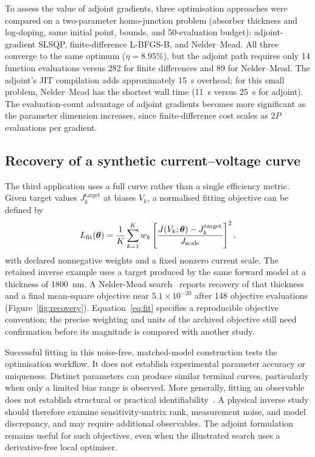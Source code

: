 To assess the value of adjoint gradients, three optimisation approaches
were compared on a two-parameter homo-junction problem (absorber thickness
and log-doping, same initial point, bounds, and 50-evaluation budget):
adjoint-gradient SLSQP, finite-difference L-BFGS-B, and Nelder--Mead.
All three converge to the same optimum ($\eta=8.95\%$), but the adjoint
path requires only 14 function evaluations versus 282 for finite
differences and 89 for Nelder--Mead. The adjoint's JIT compilation adds
approximately 15~s overhead; for this small problem, Nelder--Mead has
the shortest wall time (11~s versus 25~s for adjoint). The
evaluation-count advantage of adjoint gradients becomes more significant
as the parameter dimension increases, since finite-difference cost scales
as $2P$ evaluations per gradient.


\subsection{Recovery of a synthetic current--voltage curve}
The third application uses a full curve rather than a single efficiency
metric. Given target values $J_k^{\mathrm{target}}$ at biases $V_k$, a
normalised fitting objective can be defined by
\begin{equation}
L_{\mathrm{fit}}(\boldsymbol{\theta})=\frac{1}{K}\sum_{k=1}^{K}w_k
\left[\frac{J(V_k;\boldsymbol{\theta})-J_k^{\mathrm{target}}}{J_{\mathrm{scale}}}\right]^2,
\label{eq:fit}
\end{equation}
with declared nonnegative weights and a fixed nonzero current scale.
The retained inverse example uses a target produced by the same forward
model at a thickness of 1800~nm. A Nelder-Mead search~\cite{nelder1965}
reports recovery of that thickness and a final mean-square objective near
$5.1\times10^{-20}$ after 148 objective evaluations
(Figure~\ref{fig:recovery}).
Equation~\eqref{eq:fit} specifies a reproducible objective convention;
the precise weighting and units of the archived objective still need
confirmation before its magnitude is compared with another study.

Successful fitting in this noise-free, matched-model construction tests
the optimisation workflow. It does not establish experimental parameter
accuracy or uniqueness. Distinct parameters can produce similar terminal
curves, particularly when only a limited bias range is observed. More
generally, fitting an observable does not establish structural or
practical identifiability~\cite{raue2009}. A
physical inverse study should therefore examine sensitivity-matrix rank,
measurement noise, and model discrepancy, and may require additional
observables. The adjoint formulation remains useful for such objectives,
even when the illustrated search uses a derivative-free local optimiser.

